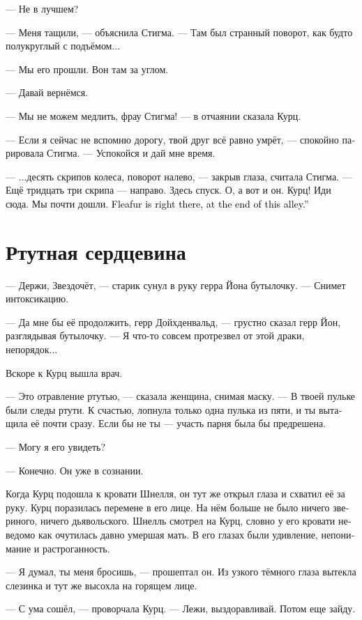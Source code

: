 \documentclass[a4paper,12pt,fleqn]{book}\usepackage{cooltooltips}\usepackage{polyglossia}\setdefaultlanguage[babelshorthands=true]{russian}\setotherlanguage{english}\defaultfontfeatures{Ligatures=TeX,Mapping=tex-text} \usepackage{xcolor}\definecolor{lightgray}{HTML}{bbbbbb}\color{lightgray}\newcommand{\ml}[3]{\textenglish{\textcolor{black}{#3}}}
\begin{document}
--- Не в лучшем?

--- Меня тащили, --- объяснила Стигма.
--- Там был странный поворот, как будто полукруглый с подъёмом...

--- Мы его прошли.
Вон там за углом.

--- Давай вернёмся.

--- Мы не можем медлить, фрау Стигма! --- в отчаянии сказала Курц.

--- Если я сейчас не вспомню дорогу, твой друг всё равно умрёт, --- спокойно парировала Стигма.
--- Успокойся и дай мне время.

--- ...десять скрипов колеса, поворот налево, --- закрыв глаза, считала Стигма.
--- Ещё тридцать три скрипа --- направо.
Здесь спуск.
О, а вот и он.
Курц!
Иди сюда.
Мы почти дошли.
\ml{$0$}
{Блошница вон там, внизу этой улицы.}
{Fleafur is right there, at the end of this alley.''} %

\section{Ртутная сердцевина}

--- Держи, Звездочёт, --- старик сунул в руку герра Йона бутылочку.
--- Снимет интоксикацию.

--- Да мне бы её продолжить, герр Дойхденвальд, --- грустно сказал герр Йон, разглядывая бутылочку.
--- Я что-то совсем протрезвел от этой драки, непорядок...

Вскоре к Курц вышла врач.

--- Это отравление ртутью, --- сказала женщина, снимая маску.
--- В твоей пульке были следы ртути.
К счастью, лопнула только одна пулька из пяти, и ты вытащила её почти сразу.
Если бы не ты --- участь парня была бы предрешена.

--- Могу я его увидеть?

--- Конечно.
Он уже в сознании.

Когда Курц подошла к кровати Шнелля, он тут же открыл глаза и схватил её за руку.
Курц поразилась перемене в его лице.
На нём больше не было ничего звериного, ничего дьявольского.
Шнелль смотрел на Курц, словно у его кровати неведомо как очутилась давно умершая мать.
В его глазах были удивление, непонимание и растроганность.

--- Я думал, ты меня бросишь, --- прошептал он.
Из узкого тёмного глаза вытекла слезинка и тут же высохла на горящем лице.

--- С ума сошёл, --- проворчала Курц.
--- Лежи, выздоравливай.
Потом еще зайду.
\end{document}
